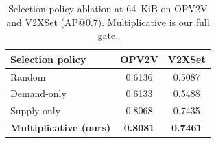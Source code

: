 \begin{table}[t]
\centering
\small
\caption{Selection-policy ablation at 64~KiB on OPV2V and V2XSet (AP@0.7). Multiplicative is our full gate.}
\label{tab:policy-ap}
\begin{tabular*}{\linewidth}{@{\extracolsep{\fill}}lcc@{}}
\toprule
Selection policy & OPV2V & V2XSet \\
\midrule
Random                        & 0.6136 & 0.5087 \\
Demand-only                   & 0.6133 & 0.5488 \\
Supply-only                   & 0.8068 & 0.7435 \\
\textbf{Multiplicative (ours)} & \textbf{0.8081} & \textbf{0.7461} \\
\bottomrule
\end{tabular*}
\end{table}
